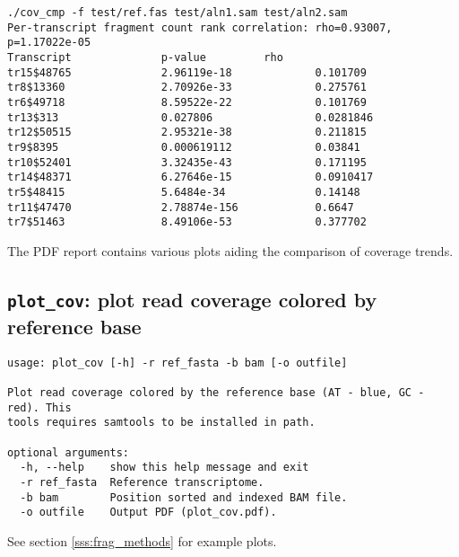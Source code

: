\begin{verbatim}
./cov_cmp -f test/ref.fas test/aln1.sam test/aln2.sam
Per-transcript fragment count rank correlation: rho=0.93007, p=1.17022e-05
Transcript              p-value         rho
tr15$48765              2.96119e-18             0.101709
tr8$13360               2.70926e-33             0.275761
tr6$49718               8.59522e-22             0.101769
tr13$313                0.027806                0.0281846
tr12$50515              2.95321e-38             0.211815
tr9$8395                0.000619112             0.03841
tr10$52401              3.32435e-43             0.171195
tr14$48371              6.27646e-15             0.0910417
tr5$48415               5.6484e-34              0.14148
tr11$47470              2.78874e-156            0.6647
tr7$51463               8.49106e-53             0.377702
\end{verbatim}

The PDF report contains various plots aiding the comparison of coverage trends.

\subsection{{\tt plot\_cov}: plot read coverage colored by reference base}

\begin{verbatim}
usage: plot_cov [-h] -r ref_fasta -b bam [-o outfile]

Plot read coverage colored by the reference base (AT - blue, GC - red). This
tools requires samtools to be installed in path.

optional arguments:
  -h, --help    show this help message and exit
  -r ref_fasta  Reference transcriptome.
  -b bam        Position sorted and indexed BAM file.
  -o outfile    Output PDF (plot_cov.pdf).
\end{verbatim}

See section \ref{sss:frag_methods} for example plots.

